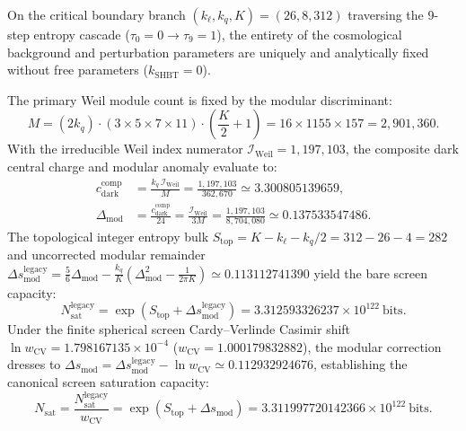 \documentclass[11pt,letterpaper]{article}
\theoremstyle{plain}
\newcommand{\cdarkcomp}{c_{\text{dark}}^{\text{comp}}}
\newcommand{\Nsat}{N_{\text{sat}}}
\newcommand{\DeltaMod}{\Delta_{\text{mod}}}
\begin{document}
On the critical boundary branch $(k_\ell, k_q, K) = (26, 8, 312)$ traversing the 9-step entropy cascade ($\tau_0 = 0 \to \tau_9 = 1$), the entirety of the cosmological background and perturbation parameters are uniquely and analytically fixed without free parameters ($k_{\text{SHBT}} = 0$).

The primary Weil module count is fixed by the modular discriminant:
\begin{equation}
\label{eq:weil-module-count-exact}
M = (2 k_q) \cdot (3 \times 5 \times 7 \times 11) \cdot \left(\frac{K}{2} + 1\right) = 16 \times 1155 \times 157 = 2{,}901{,}360.
\end{equation}
With the irreducible Weil index numerator $\mathcal{I}_{\text{Weil}} = 1{,}197{,}103$, the composite dark central charge and modular anomaly evaluate to:
\begin{equation}
\label{eq:dark-charge-anomaly-exact}
\begin{aligned}
\cdarkcomp &= \frac{k_q \, \mathcal{I}_{\text{Weil}}}{M} = \frac{1{,}197{,}103}{362{,}670} \simeq 3.300805139659, \\
\DeltaMod &= \frac{\cdarkcomp}{24} = \frac{\mathcal{I}_{\text{Weil}}}{3 M} = \frac{1{,}197{,}103}{8{,}704{,}080} \simeq 0.137533547486.
\end{aligned}
\end{equation}
The topological integer entropy bulk $S_{\text{top}} = K - k_\ell - k_q/2 = 312 - 26 - 4 = 282$ and uncorrected modular remainder $\Delta s_{\text{mod}}^{\text{legacy}} = \frac{5}{6}\DeltaMod - \frac{k_q}{K}(\DeltaMod^2 - \frac{1}{2\pi K}) \simeq 0.113112741390$ yield the bare screen capacity:
\begin{equation}
\label{eq:nsat-legacy-exact}
N_{\text{sat}}^{\text{legacy}} = \exp\left(S_{\text{top}} + \Delta s_{\text{mod}}^{\text{legacy}}\right) = 3.312593326237 \times 10^{122}\ \text{bits}.
\end{equation}
Under the finite spherical screen Cardy--Verlinde Casimir shift $\ln w_{\text{CV}} = 1.798167135 \times 10^{-4}$ ($w_{\text{CV}} = 1.000179832882$), the modular correction dresses to $\Delta s_{\text{mod}} = \Delta s_{\text{mod}}^{\text{legacy}} - \ln w_{\text{CV}} \simeq 0.112932924676$, establishing the canonical screen saturation capacity:
\begin{equation}
\label{eq:nsat-canonical-exact}
\Nsat = \frac{N_{\text{sat}}^{\text{legacy}}}{w_{\text{CV}}} = \exp\left(S_{\text{top}} + \Delta s_{\text{mod}}\right) = 3.311997720142366 \times 10^{122}\ \text{bits}.
\end{equation}
\end{document}
